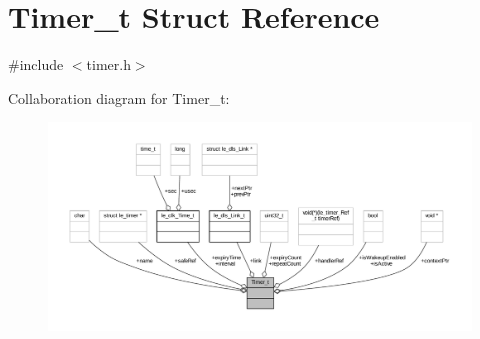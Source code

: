 \hypertarget{struct_timer__t}{}\section{Timer\+\_\+t Struct Reference}
\label{struct_timer__t}


{\ttfamily \#include $<$timer.\+h$>$}



Collaboration diagram for Timer\+\_\+t\+:
\nopagebreak
\begin{figure}[H]
\begin{center}
\leavevmode
\includegraphics[width=350pt]{struct_timer__t__coll__graph}
\end{center}
\end{figure}
